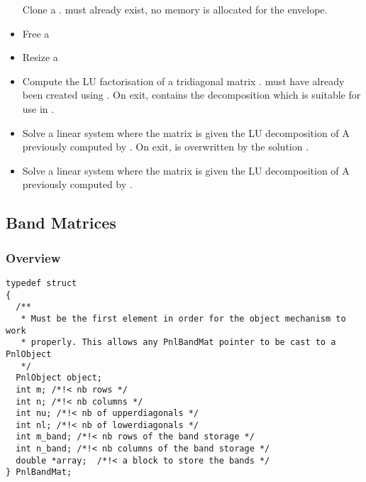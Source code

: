 \begin{itemize}
    \sshortdescribe Clone a \PnlTridiagMatLU.  must
    already exist, no memory is allocated for the envelope. 
  \item {}
    \sshortdescribe Free a \PnlTridiagMatLU
  \item {}
    \sshortdescribe Resize a \PnlTridiagMatLU
  \item {}
    \sshortdescribe Compute the LU factorisation of a tridiagonal matrix
    .  must have already been created using
    . On exit,  contains the
    decomposition which is suitable for use in .
  \item {}
    \sshortdescribe Solve a linear system  where the matrix 
    is given the LU decomposition of A previously computed by
    . On exit,  is overwritten by the
    solution . 
  \item {}
    \sshortdescribe Solve a linear system  where the matrix 
    is given the LU decomposition of A previously computed by
    . 
\end{itemize}



\subsection{Band Matrices}
\subsubsection{Overview}

\begin{verbatim}
typedef struct
{
  /**
   * Must be the first element in order for the object mechanism to work
   * properly. This allows any PnlBandMat pointer to be cast to a PnlObject
   */
  PnlObject object; 
  int m; /*!< nb rows */ 
  int n; /*!< nb columns */ 
  int nu; /*!< nb of upperdiagonals */
  int nl; /*!< nb of lowerdiagonals */
  int m_band; /*!< nb rows of the band storage */
  int n_band; /*!< nb columns of the band storage */
  double *array;  /*!< a block to store the bands */  
} PnlBandMat;
\end{verbatim}


